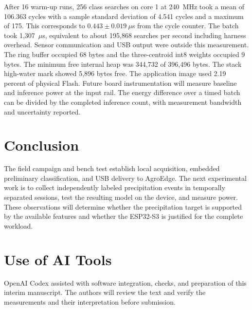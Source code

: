 \documentclass[conference]{IEEEtran}
\begin{document}
After 16 warm-up runs, 256 class searches on core 1 at 240~MHz took a mean of 106.363 cycles with a sample standard deviation of 4.541 cycles and a maximum of 175. This corresponds to $0.443\pm0.019~\mu$s from the cycle counter. The batch took 1,307~$\mu$s, equivalent to about 195,868 searches per second including harness overhead. Sensor communication and USB output were outside this measurement. The ring buffer occupied 68 bytes and the three-centroid int8 weights occupied 9 bytes. The minimum free internal heap was 344,732 of 396,496 bytes. The stack high-water mark showed 5,896 bytes free. The application image used 2.19 percent of physical Flash. Future board instrumentation will measure baseline and inference power at the input rail. The energy difference over a timed batch can be divided by the completed inference count, with measurement bandwidth and uncertainty reported.

\section{Conclusion}
The field campaign and bench test establish local acquisition, embedded preliminary classification, and USB delivery to AgroEdge. The next experimental work is to collect independently labeled precipitation events in temporally separated sessions, test the resulting model on the device, and measure power. These observations will determine whether the precipitation target is supported by the available features and whether the ESP32-S3 is justified for the complete workload.

\section*{Use of AI Tools}
OpenAI Codex assisted with software integration, checks, and preparation of this interim manuscript. The authors will review the text and verify the measurements and their interpretation before submission.
\end{document}
